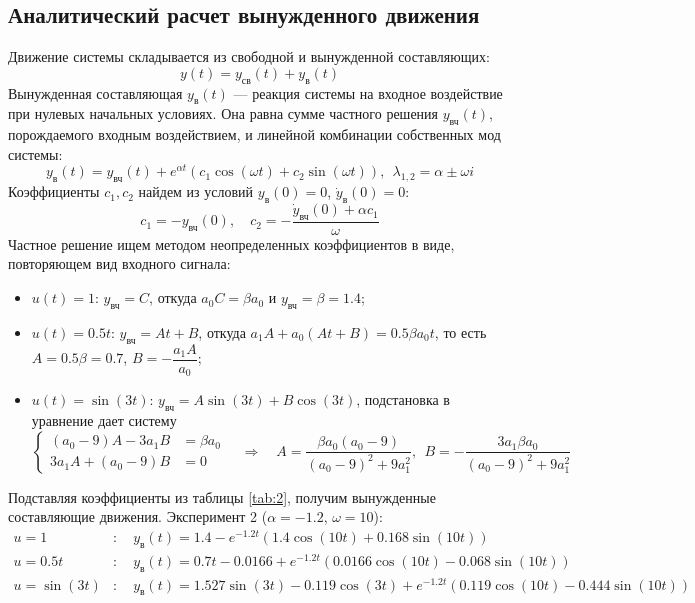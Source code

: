 \documentclass[a4paper, 12pt]{article}
\begin{document}
\subsection{Аналитический расчет вынужденного движения}
Движение системы складывается из свободной и вынужденной составляющих:
\[
    y(t) = y_{\text{св}}(t) + y_{\text{в}}(t)
\]
Вынужденная составляющая $y_{\text{в}}(t)$ --- реакция системы на входное воздействие при нулевых начальных условиях. Она равна сумме частного решения $y_{\text{вч}}(t)$, порождаемого входным воздействием, и линейной комбинации собственных мод системы:
\[
    y_{\text{в}}(t) = y_{\text{вч}}(t) + e^{\alpha t}(c_1\cos{(\omega t)} + c_2\sin{(\omega t)}), \ \ \lambda_{1,2} = \alpha \pm \omega i
\]
Коэффициенты $c_1, c_2$ найдем из условий $y_{\text{в}}(0) = 0$, $\dot{y}_{\text{в}}(0) = 0$:
\[
    c_1 = -y_{\text{вч}}(0), \quad c_2 = -\frac{\dot{y}_{\text{вч}}(0) + \alpha c_1}{\omega}
\]
Частное решение ищем методом неопределенных коэффициентов в виде, повторяющем вид входного сигнала:
\begin{itemize}
    \item $u(t) = 1$: $y_{\text{вч}} = C$, откуда $a_0 C = \beta a_0$ и $y_{\text{вч}} = \beta = 1.4$;
    \item $u(t) = 0.5t$: $y_{\text{вч}} = At + B$, откуда $a_1 A + a_0(At + B) = 0.5\beta a_0 t$, то есть $A = 0.5\beta = 0.7$, $B = -\dfrac{a_1 A}{a_0}$;
    \item $u(t) = \sin{(3t)}$: $y_{\text{вч}} = A\sin{(3t)} + B\cos{(3t)}$, подстановка в уравнение дает систему
    \[
        \left\{
            \begin{aligned}
                (a_0 - 9)A - 3a_1 B &= \beta a_0 \\
                3a_1 A + (a_0 - 9)B &= 0
            \end{aligned}
        \right.
        \quad \Rightarrow \quad
        A = \frac{\beta a_0 (a_0 - 9)}{(a_0 - 9)^2 + 9a_1^2}, \ \ B = -\frac{3 a_1 \beta a_0}{(a_0 - 9)^2 + 9a_1^2}
    \]
\end{itemize}
Подставляя коэффициенты из таблицы \ref{tab:2}, получим вынужденные составляющие движения.
\newline
Эксперимент 2 ($\alpha = -1.2$, $\omega = 10$):
\begin{align*}
    u = 1&: \quad y_{\text{в}}(t) = 1.4 - e^{-1.2t}(1.4\cos{(10t)} + 0.168\sin{(10t)}) \\
    u = 0.5t&: \quad y_{\text{в}}(t) = 0.7t - 0.0166 + e^{-1.2t}(0.0166\cos{(10t)} - 0.068\sin{(10t)}) \\
    u = \sin{(3t)}&: \quad y_{\text{в}}(t) = 1.527\sin{(3t)} - 0.119\cos{(3t)} + e^{-1.2t}(0.119\cos{(10t)} - 0.444\sin{(10t)})
\end{align*}
\end{document}
